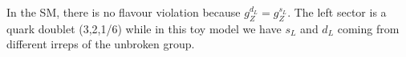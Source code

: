 \documentclass[../main.tex]{subfiles}
\begin{document}
\begin{kaobox}[frametitle=Toy model]
In the SM, there is no flavour violation because $g_Z^{d_L}=g_Z^{s_L}$. The left sector is a quark doublet (3,2,1/6) while in this toy model we have $s_L$ and $d_L$ coming from different irreps of the unbroken group.
\end{kaobox}
\end{document}
